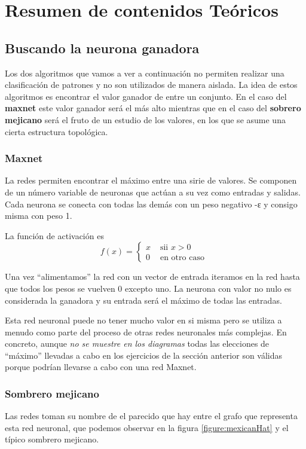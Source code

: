 \section{Resumen de contenidos Teóricos}
\subsection{Buscando la neurona ganadora}

Los dos algoritmos que vamos a ver a continuación no permiten realizar una clasificación de patrones y no son utilizados de manera aislada. La idea de estos algoritmos es encontrar el valor ganador de entre un conjunto. En el caso del \textbf{maxnet} este valor ganador será el más alto mientras que en el caso del \textbf{sobrero mejicano} será el fruto de un estudio de los valores, en los que se asume una cierta estructura topológica.

\subsubsection{Maxnet}
La redes  permiten encontrar el máximo entre una sirie de valores. Se componen de un número variable de neuronas que actúan a su vez como entradas y salidas. Cada neurona se conecta con todas las demás con un peso negativo -ε y consigo misma con peso 1.

La función de activación es
\[f(x) = \left\{\begin{array}{ll} x & \text{ sii } x > 0 \\ 0 & \text{ en otro caso } \end{array} \right.\]

Una vez ``alimentamos'' la red con un vector de entrada iteramos en la red hasta que todos los pesos se vuelven 0 excepto uno. La neurona con valor no nulo es considerada la ganadora y su entrada será el máximo de todas las entradas.

\obs Esta red neuronal puede no tener mucho valor en si misma pero se utiliza a menudo como parte del proceso de otras redes neuronales más complejas. En concreto, aunque \emph{no se muestre en los diagramas} todas las elecciones de ``máximo'' llevadas a cabo en los ejercicios de la sección anterior son válidas porque podrían llevarse a cabo con una red Maxnet.

\subsubsection{Sombrero mejicano}
Las redes  toman su nombre de el parecido que hay entre el grafo que representa esta red neuronal, que podemos observar en la figura \ref{figure:mexicanHat} y el típico sombrero mejicano.

